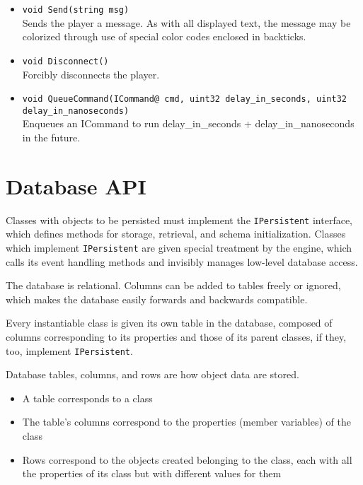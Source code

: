 \documentclass{book}
\begin{document}
\begin{itemize}
\item \texttt{void Send(string msg)}\\ Sends the player a message. As with all
  displayed text, the message may be colorized through use of special color
  codes enclosed in backticks.

\item \texttt{void Disconnect()}\\
  Forcibly disconnects the player.

\item \texttt{void QueueCommand(ICommand@ cmd, uint32 delay\_in\_seconds, uint32
  delay\_in\_nanoseconds)}\\ Enqueues an ICommand to run delay\_in\_seconds +
  delay\_in\_nanoseconds in the future.

\end{itemize}

\chapter{Database API}

Classes with objects to be persisted must implement the \texttt{IPersistent}
interface, which defines methods for storage, retrieval, and schema
initialization. Classes which implement \texttt{IPersistent} are given special
treatment by the engine, which calls its event handling methods and invisibly
manages low-level database access.

The database is relational. Columns can be added to tables freely or
ignored, which makes the database easily forwards and backwards compatible.

Every instantiable class is given its own table in the database, composed of
columns corresponding to its properties and those of its parent classes, if
they, too, implement \texttt{IPersistent}.

Database tables, columns, and rows are how object data are stored.
\begin{itemize}
\item A table corresponds to a class
\item The table's columns correspond to the properties (member variables) of the class
\item Rows correspond to the objects created belonging to the class, each with all the properties of
  its class but with different values for them
\end{itemize}
\end{document}
